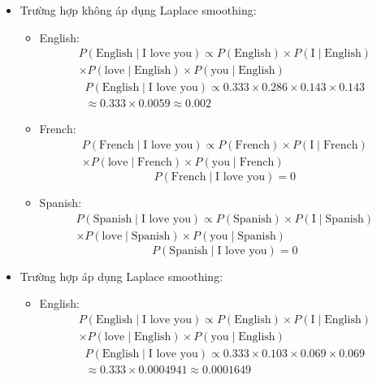 \begin{itemize}
    \item Trường hợp không áp dụng Laplace smoothing:
    \begin{itemize}
        \item English:
\begin{multline*}
P(\text{English} \mid \text{I love you}) \propto P(\text{English}) \times P(\text{I} \mid \text{English}) \\
\times P(\text{love} \mid \text{English}) \times P(\text{you} \mid \text{English})
\end{multline*}
\begin{multline*}
P(\text{English} \mid \text{I love you}) \propto 0.333 \times 0.286 \times 0.143 \times 0.143 \\
\approx 0.333 \times 0.0059 \approx 0.002
\end{multline*}

        \item French:
\begin{multline*}
P(\text{French} \mid \text{I love you}) \propto P(\text{French}) \times P(\text{I} \mid \text{French}) \\
\times P(\text{love} \mid \text{French}) \times P(\text{you} \mid \text{French})
\end{multline*}
\[
P(\text{French} \mid \text{I love you}) = 0
\]

        \item Spanish:
\begin{multline*}
P(\text{Spanish} \mid \text{I love you}) \propto P(\text{Spanish}) \times P(\text{I} \mid \text{Spanish}) \\
\times P(\text{love} \mid \text{Spanish}) \times P(\text{you} \mid \text{Spanish})
\end{multline*}
\[
P(\text{Spanish} \mid \text{I love you}) = 0
\]
    \end{itemize}
    \clearpage
    \item Trường hợp áp dụng Laplace smoothing:
    \begin{itemize}
        \item English:
\begin{multline*}
P(\text{English} \mid \text{I love you}) \propto P(\text{English}) \times P(\text{I} \mid \text{English}) \\
\times P(\text{love} \mid \text{English}) \times P(\text{you} \mid \text{English})
\end{multline*}
\begin{multline*}
P(\text{English} \mid \text{I love you}) \propto 0.333 \times 0.103 \times 0.069 \times 0.069 \\
\approx 0.333 \times 0.0004941 \approx 0.0001649
\end{multline*}


\end{itemize}
\end{itemize}
